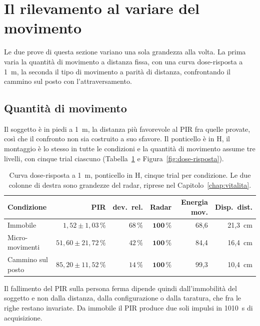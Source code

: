 \section{Il rilevamento al variare del movimento}
\label{sec:dose-risposta}
\label{sec:pir-movimento}

Le due prove di questa sezione variano una sola grandezza alla volta. La prima varia la quantità di movimento a distanza fissa, con una curva dose-risposta a 1~m, la seconda il tipo di movimento a parità di distanza, confrontando il cammino sul posto con l'attraversamento.

\subsection{Quantità di movimento}
\label{sec:dose-risposta-1m}

Il soggetto è in piedi a 1~m, la distanza più favorevole al PIR fra quelle provate, così che il confronto non sia costruito a suo sfavore. Il ponticello è in H, il montaggio è lo stesso in tutte le condizioni e la quantità di movimento assume tre livelli, con cinque trial ciascuno (Tabella~\ref{tab:dose-risposta} e Figura~\ref{fig:dose-risposta}).

\begin{table}[htbp]
\centering
\caption{Curva dose-risposta a 1~m, ponticello in H, cinque trial per condizione. Le due colonne
di destra sono grandezze del radar, riprese nel Capitolo~\ref{chap:vitalita}.}
\label{tab:dose-risposta}

\small
\begin{tabular}{@{}lrrrrr@{}}
\toprule
\textbf{Condizione} & \textbf{PIR} & \textbf{dev.\ rel.} & \textbf{Radar} &
\textbf{Energia mov.} & \textbf{Disp.\ dist.} \\
\midrule
Immobile          & $1{,}52 \pm 1{,}03\,\%$   & $68\,\%$ & $\mathbf{100\,\%}$ & 68,6 & 21,3~cm \\
Micro-movimenti   & $51{,}60 \pm 21{,}72\,\%$ & $42\,\%$ & $\mathbf{100\,\%}$ & 84,4 & 16,4~cm \\
Cammino sul posto & $85{,}20 \pm 11{,}52\,\%$ & $14\,\%$ & $\mathbf{100\,\%}$ & 99,3 & 10,4~cm \\
\bottomrule
\end{tabular}
\end{table}

Il fallimento del PIR sulla persona ferma dipende quindi dall'immobilità del soggetto e non dalla distanza, dalla configurazione o dalla taratura, che fra le righe restano invariate. Da immobile il PIR produce due soli impulsi in 1010~s di acquisizione.


